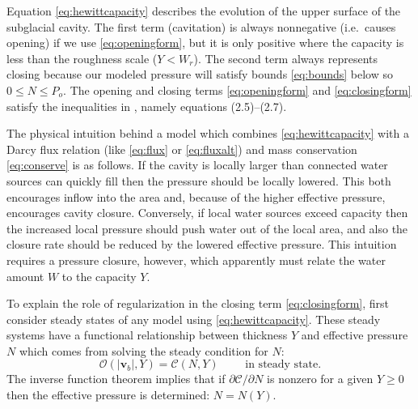 \documentclass[11pt,final]{amsart}%
\newcommand\bv{\mathbf{v}}
\begin{document}
Equation \eqref{eq:hewittcapacity} describes the evolution of the upper surface of the subglacial cavity.  The first term (cavitation) is always nonnegative (i.e.~causes opening) if we use \eqref{eq:openingform}, but it is only positive where the capacity is less than the roughness scale ($Y<W_r$).  The second term always represents closing because our modeled pressure will satisfy bounds \eqref{eq:bounds} below so $0\le N \le P_o$.  The opening and closing terms \eqref{eq:openingform} and \eqref{eq:closingform} satisfy the inequalities in \cite{Schoofetal2012}, namely equations (2.5)--(2.7).

The physical intuition behind a model which combines \eqref{eq:hewittcapacity} with a Darcy flux relation (like \eqref{eq:flux} or \eqref{eq:fluxalt}) and mass conservation \eqref{eq:conserve} is as follows.  If the cavity is locally larger than connected water sources can quickly fill then the pressure should be locally lowered.  This both encourages inflow into the area and, because of the higher effective pressure, encourages cavity closure.  Conversely, if local water sources exceed capacity then the increased local pressure should push water out of the local area, and also the closure rate should be reduced by the lowered effective pressure.  This intuition requires a pressure closure, however, which apparently must relate the water amount $W$ to the capacity $Y$.

To explain the role of regularization in the closing term \eqref{eq:closingform}, first consider steady states of any model using \eqref{eq:hewittcapacity}.  These steady systems have a functional relationship between thickness $Y$ and effective pressure $N$ which comes from solving the steady condition for $N$:
\begin{equation}
\mathcal{O}(|\bv_b|,Y) = \mathcal{C}(N,Y) \qquad \text{ in steady state}. \label{eq:hewittsteady}
\end{equation}
The inverse function theorem implies that if $\partial\mathcal{C}/\partial N$ is nonzero for a given $Y\ge 0$ then the effective pressure is determined: $N=N(Y)$.
\end{document}
